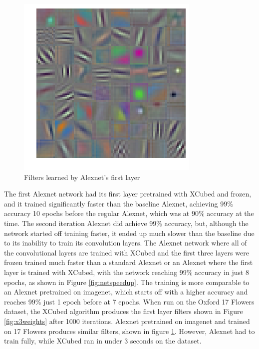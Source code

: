 \documentclass{article}
\begin{document}
\begin{figure}
    \centering
    \includegraphics[width=.8\linewidth]{trainedfet}
    \caption{Filters learned by Alexnet's first layer}
    \label{fig:learnedweights}
\end{figure}
The first Alexnet network had its first layer pretrained with XCubed and frozen, and it trained significantly faster than the baseline Alexnet, achieving 99\% accuracy 10 epochs before the regular Alexnet, which was at 90\% accuracy at the time. The second iteration Alexnet did achieve 99\% accuracy, but, although the network started off training faster, it ended up much slower than the baseline due to its inability to train its convolution layers. The Alexnet network where all of the convolutional layers are trained with XCubed and the first three layers were frozen trained much faster than a standard Alexnet or an Alexnet where the first layer is trained with XCubed, with the network reaching 99\% accuracy in just 8 epochs, as shown in Figure \ref{fig:netspeedup}. The training is more comparable to an Alexnet pretrained on imagenet, which starts off with a higher accuracy and reaches 99\% just 1 epoch before at 7 epochs. When run on the Oxford 17 Flowers dataset, the XCubed algorithm produces the first layer filters shown in Figure \ref{fig:x3weights} after 1000 iterations. Alexnet pretrained on imagenet and trained on 17 Flowers produces similar filters, shown in figure \ref{fig:learnedweights}. However, Alexnet had to train fully, while XCubed ran in under 3 seconds on the dataset.
\end{document}

